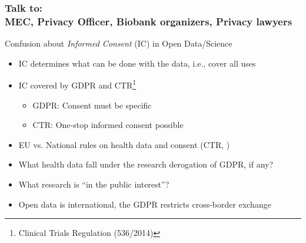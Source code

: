 \documentclass[xcolor=dvipsnames]{beamer}
\begin{document}
\begin{frame}
	\frametitle{Talk to: \\
	MEC, Privacy Officer, Biobank organizers, Privacy lawyers}
	
	\begin{block}{Confusion about {\em Informed Consent} (IC) in Open Data/Science}
	\begin{itemize}
	\item IC determines what can be done with the data, i.e., cover all uses
	\item IC covered by GDPR and CTR\footnote[frame]{Clinical Trials Regulation (536/2014)} {\scriptsize \cite{EU2014CTR,schneider2016deciphering}}
	\begin{itemize}
	\item GDPR: Consent must be specific {\scriptsize \cite{GDPR_EU,chassang2017impact}}
	\item CTR: One-stop informed consent possible {\scriptsize \cite{mende2017principles,dittrich2015esmod}}
	\end{itemize}
	\item EU vs. National rules on health data and consent (CTR, {\scriptsize\cite{chassang2017impact}})
	\item What health data fall under the research derogation of GDPR, if any?
	\item What research is ``in the public interest''?
	\item Open data is international, the GDPR restricts cross-border exchange
	\end{itemize}
	\end{block}	
\end{frame}
\end{document}
